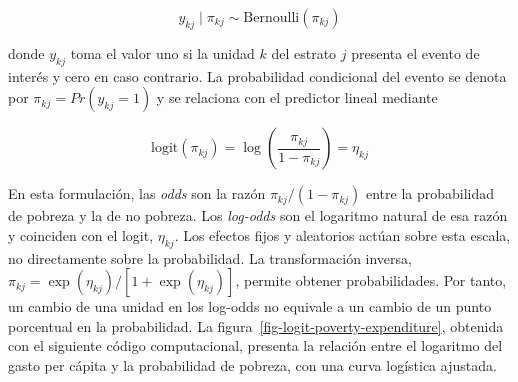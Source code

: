 \documentclass[
  spanish,
  11pt,
  letterpaper,
  oneside,
  open=any]{scrbook}
\newenvironment{Shaded}{\begin{snugshade}}{\end{snugshade}}
\newcommand{\AttributeTok}[1]{\textcolor[rgb]{0.40,0.45,0.13}{#1}}
\newcommand{\DecValTok}[1]{\textcolor[rgb]{0.68,0.00,0.00}{#1}}
\newcommand{\FunctionTok}[1]{\textcolor[rgb]{0.28,0.35,0.67}{#1}}
\newcommand{\NormalTok}[1]{\textcolor[rgb]{0.00,0.23,0.31}{#1}}
\newcommand{\OtherTok}[1]{\textcolor[rgb]{0.00,0.23,0.31}{#1}}
\newcommand{\SpecialCharTok}[1]{\textcolor[rgb]{0.37,0.37,0.37}{#1}}
\newcommand{\StringTok}[1]{\textcolor[rgb]{0.13,0.47,0.30}{#1}}
\begin{document}
\[
y_{kj} \mid \pi_{kj} \sim \text{Bernoulli}(\pi_{kj})
\]

donde \(y_{kj}\) toma el valor uno si la unidad \(k\) del estrato \(j\)
presenta el evento de interés y cero en caso contrario. La probabilidad
condicional del evento se denota por \(\pi_{kj}=Pr(y_{kj}=1)\) y se
relaciona con el predictor lineal mediante

\[
\text{logit}(\pi_{kj}) =
\log\left(\frac{\pi_{kj}}{1-\pi_{kj}}\right)
= \eta_{kj}
\]

En esta formulación, las \emph{odds} son la razón
\(\pi_{kj}/(1-\pi_{kj})\) entre la probabilidad de pobreza y la de no
pobreza. Los \emph{log-odds} son el logaritmo natural de esa razón y
coinciden con el logit, \(\eta_{kj}\). Los efectos fijos y aleatorios
actúan sobre esta escala, no directamente sobre la probabilidad. La
transformación inversa,
\(\pi_{kj}=\exp(\eta_{kj})/[1+\exp(\eta_{kj})]\), permite obtener
probabilidades. Por tanto, un cambio de una unidad en los log-odds no
equivale a un cambio de un punto porcentual en la probabilidad. La
figura~\ref{fig-logit-poverty-expenditure}, obtenida con el siguiente
código computacional, presenta la relación entre el logaritmo del gasto
per cápita y la probabilidad de pobreza, con una curva logística
ajustada.

\begin{Shaded}
\end{Shaded}
\end{document}
